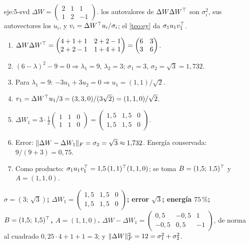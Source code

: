 \begin{solucion}{eje:5-svd}
\datos $\Delta W=\begin{pmatrix}2&1&1\\1&2&-1\end{pmatrix}$.
\planteamiento los autovalores de $\Delta W\Delta W^{\top}$ son $\sigma_i^{2}$, sus autovectores los $u_i$, y $v_i=\Delta W^{\top} u_i/\sigma_i$; el \cref{teo:ey} da $\sigma_1u_1v_1^{\top}$.
\pasos
\begin{enumerate}[label=\arabic*.]
  \item $\Delta W\Delta W^{\top}=\begin{pmatrix}4+1+1&2+2-1\\2+2-1&1+4+1\end{pmatrix}=\begin{pmatrix}6&3\\3&6\end{pmatrix}$.
  \item $(6-\lambda)^{2}-9=0\Rightarrow\lambda_1=9$, $\lambda_2=3$; $\sigma_1=3$, $\sigma_2=\sqrt3=1{,}732$.
  \item Para $\lambda_1=9$: $-3u_1+3u_2=0\Rightarrow u_1=(1,1)/\sqrt2$.
  \item $v_1=\Delta W^{\top} u_1/3=(3,3,0)/(3\sqrt2)=(1,1,0)/\sqrt2$.
  \item $\Delta W_1=3\cdot\frac12\begin{pmatrix}1&1&0\\1&1&0\end{pmatrix}=\begin{pmatrix}1{,}5&1{,}5&0\\1{,}5&1{,}5&0\end{pmatrix}$.
  \item Error: $\lVert\Delta W-\Delta W_1\rVert_F=\sigma_2=\sqrt3\approx 1{,}732$. Energía conservada: $9/(9+3)=0{,}75$.
  \item Como producto: $\sigma_1u_1v_1^{\top}=1{,}5\,(1,1)^{\top}(1,1,0)$; se toma $B=(1{,}5;\,1{,}5)^{\top}$ y $A=(1,1,0)$.
\end{enumerate}
\resultado \textbf{$\sigma=(3;\,\sqrt3)$; $\Delta W_1=\begin{pmatrix}1{,}5&1{,}5&0\\1{,}5&1{,}5&0\end{pmatrix}$; error $\sqrt3$; energía $75\,\%$; $B=(1{,}5;\,1{,}5)^{\top}$, $A=(1,1,0)$.}
\comprobacion $\Delta W-\Delta W_1=\begin{pmatrix}0{,}5&-0{,}5&1\\-0{,}5&0{,}5&-1\end{pmatrix}$, de norma al cuadrado $0{,}25\cdot 4+1+1=3$; y $\lVert\Delta W\rVert_F^{2}=12=\sigma_1^{2}+\sigma_2^{2}$.
\end{solucion}


